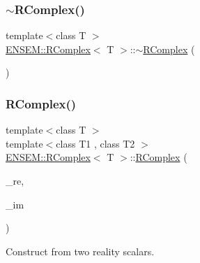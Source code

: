 \mbox{\label{classENSEM_1_1RComplex_a6e888c12c12f117dab2c0fd122b7b8d7}} 
\subsubsection{\texorpdfstring{$\sim$RComplex()}{~RComplex()}\hspace{0.1cm}{\footnotesize\ttfamily [1/2]}}
{\footnotesize\ttfamily template$<$class T $>$ \\
\mbox{\hyperlink{classENSEM_1_1RComplex}{E\+N\+S\+E\+M\+::\+R\+Complex}}$<$ T $>$\+::$\sim$\mbox{\hyperlink{classENSEM_1_1RComplex}{R\+Complex}} (\begin{DoxyParamCaption}{ }\end{DoxyParamCaption})\hspace{0.3cm}{\ttfamily [inline]}}

\mbox{\label{classENSEM_1_1RComplex_aec74e0e2dcf90ad4b575285662713b9c}} 
\subsubsection{\texorpdfstring{RComplex()}{RComplex()}\hspace{0.1cm}{\footnotesize\ttfamily [2/8]}}
{\footnotesize\ttfamily template$<$class T $>$ \\
template$<$class T1 , class T2 $>$ \\
\mbox{\hyperlink{classENSEM_1_1RComplex}{E\+N\+S\+E\+M\+::\+R\+Complex}}$<$ T $>$\+::\mbox{\hyperlink{classENSEM_1_1RComplex}{R\+Complex}} (\begin{DoxyParamCaption}\item[{const \mbox{\hyperlink{classENSEM_1_1RScalar}{R\+Scalar}}$<$ T1 $>$ \&}]{\+\_\+re,  }\item[{const \mbox{\hyperlink{classENSEM_1_1RScalar}{R\+Scalar}}$<$ T2 $>$ \&}]{\+\_\+im }\end{DoxyParamCaption})\hspace{0.3cm}{\ttfamily [inline]}}



Construct from two reality scalars. 

